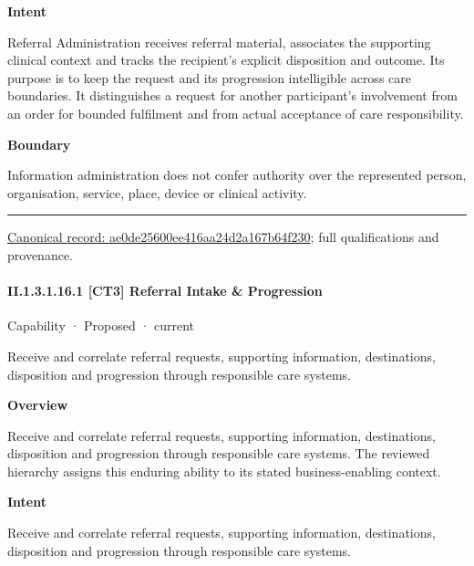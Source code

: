 \textbf{Intent}



Referral Administration receives referral material, associates the supporting clinical context and tracks the recipient's explicit disposition and outcome. Its purpose is to keep the request and its progression intelligible across care boundaries. It distinguishes a request for another participant's involvement from an order for bounded fulfilment and from actual acceptance of care responsibility.



\textbf{Boundary}



Information administration does not confer authority over the represented person, organisation, service, place, device or clinical activity.



\medskip\hrule\medskip

{\footnotesize \href{../../../../continuum/strategy/capability/ae0de25600ee416aa24d2a167b64f230.md}{Canonical record: ae0de25600ee416aa24d2a167b64f230}; full qualifications and provenance.}\par
\paragraph*{II.1.3.1.16.1 [CT3] Referral Intake \& Progression}
\label{navigation:II.1.3.1.16.1}

\label{element:d11bdb9464b2476894aa372ab9b929a7}
{\small Capability · Proposed · current}\par

Receive and correlate referral requests, supporting information, destinations, disposition and progression through responsible care systems.



\textbf{Overview}



Receive and correlate referral requests, supporting information, destinations, disposition and progression through responsible care systems. The reviewed hierarchy assigns this enduring ability to its stated business-enabling context.



\textbf{Intent}



Receive and correlate referral requests, supporting information, destinations, disposition and progression through responsible care systems.



